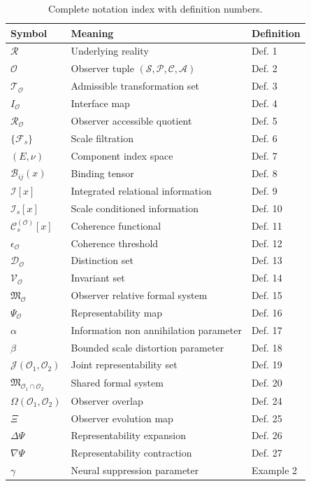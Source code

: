 \documentclass[12pt]{article}
\theoremstyle{definition}
\begin{document}
\begin{table}[ht]
\centering
\begin{tabular}{|l|l|l|}
\hline
\textbf{Symbol} & \textbf{Meaning} & \textbf{Definition} \\
\hline
$\mathcal{R}$ & Underlying reality & Def. 1 \\
$\mathcal{O}$ & Observer tuple $(\mathcal{S}, \mathcal{P}, \mathcal{C}, \mathcal{A})$ & Def. 2 \\
$\mathcal{T}_{\mathcal{O}}$ & Admissible transformation set & Def. 3 \\
$I_{\mathcal{O}}$ & Interface map & Def. 4 \\
$\mathcal{R}_{\mathcal{O}}$ & Observer accessible quotient & Def. 5 \\
$\{\mathcal{F}_s\}$ & Scale filtration & Def. 6 \\
$(E, \nu)$ & Component index space & Def. 7 \\
$\mathcal{B}_{ij}(x)$ & Binding tensor & Def. 8 \\
$\mathcal{I}[x]$ & Integrated relational information & Def. 9 \\
$\mathcal{I}_s[x]$ & Scale conditioned information & Def. 10 \\
$\mathcal{C}_s^{(\mathcal{O})}[x]$ & Coherence functional & Def. 11 \\
$\epsilon_{\mathcal{O}}$ & Coherence threshold & Def. 12 \\
$\mathcal{D}_{\mathcal{O}}$ & Distinction set & Def. 13 \\
$\mathcal{V}_{\mathcal{O}}$ & Invariant set & Def. 14 \\
$\mathfrak{M}_{\mathcal{O}}$ & Observer relative formal system & Def. 15 \\
$\Psi_{\mathcal{O}}$ & Representability map & Def. 16 \\
$\alpha$ & Information non annihilation parameter & Def. 17 \\
$\beta$ & Bounded scale distortion parameter & Def. 18 \\
$\mathcal{J}(\mathcal{O}_1, \mathcal{O}_2)$ & Joint representability set & Def. 19 \\
$\mathfrak{M}_{\mathcal{O}_1 \cap \mathcal{O}_2}$ & Shared formal system & Def. 20 \\
$\Omega(\mathcal{O}_1, \mathcal{O}_2)$ & Observer overlap & Def. 24 \\
$\Xi$ & Observer evolution map & Def. 25 \\
$\Delta\Psi$ & Representability expansion & Def. 26 \\
$\nabla\Psi$ & Representability contraction & Def. 27 \\
$\gamma$ & Neural suppression parameter & Example 2 \\
\hline
\end{tabular}
\caption{Complete notation index with definition numbers.}
\label{tab:notation}
\end{table}



\end{document}
